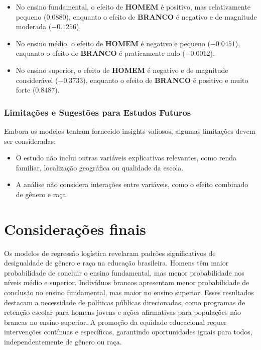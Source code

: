 \documentclass[a4paper,12pt]{article}
\begin{document}
\begin{itemize}
    \item No ensino fundamental, o efeito de \textbf{HOMEM} é positivo, mas relativamente pequeno (\(0.0880\)), enquanto o efeito de \textbf{BRANCO} é negativo e de magnitude moderada (\(-0.1256\)).
    \item No ensino médio, o efeito de \textbf{HOMEM} é negativo e pequeno (\(-0.0451\)), enquanto o efeito de \textbf{BRANCO} é praticamente nulo (\(-0.0012\)).
    \item No ensino superior, o efeito de \textbf{HOMEM} é negativo e de magnitude considerável (\(-0.3733\)), enquanto o efeito de \textbf{BRANCO} é positivo e muito forte (\(0.8487\)).
\end{itemize}


\subsubsection{Limitações e Sugestões para Estudos Futuros}

Embora os modelos tenham fornecido insights valiosos, algumas limitações devem ser consideradas:

\begin{itemize}
    \item O estudo não inclui outras variáveis explicativas relevantes, como renda familiar, localização geográfica ou qualidade da escola.
    \item A análise não considera interações entre variáveis, como o efeito combinado de gênero e raça.
\end{itemize}


\newpage


\section{Considerações finais}

Os modelos de regressão logística revelaram padrões significativos de desigualdade de gênero e raça na educação brasileira. Homens têm maior probabilidade de concluir o ensino fundamental, mas menor probabilidade nos níveis médio e superior. Indivíduos brancos apresentam menor probabilidade de conclusão no ensino fundamental, mas maior no ensino superior. Esses resultados destacam a necessidade de políticas públicas direcionadas, como programas de retenção escolar para homens jovens e ações afirmativas para populações não brancas no ensino superior. A promoção da equidade educacional requer intervenções contínuas e específicas, garantindo oportunidades iguais para todos, independentemente de gênero ou raça.
\end{document}
